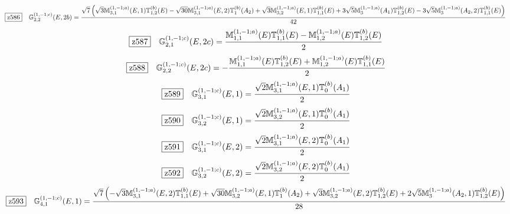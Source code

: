 \documentclass[fleqn,10pt,landscape]{jsarticle}
\begin{document}
\begin{dmath*}
\hspace*{3mm}\fbox{z586}\quad \mathbb{G}_{2,2}^{(1,-1;c)}(E,2b)=\frac{\sqrt{7} \left(\sqrt{3} \mathbb{M}_{3,1}^{(1,-1;a)}(E,1) \mathbb{T}_{1,2}^{(b)}(E) - \sqrt{30} \mathbb{M}_{3,1}^{(1,-1;a)}(E,2) \mathbb{T}_{1}^{(b)}(A_{2}) + \sqrt{3} \mathbb{M}_{3,2}^{(1,-1;a)}(E,1) \mathbb{T}_{1,1}^{(b)}(E) + 3 \sqrt{5} \mathbb{M}_{3}^{(1,-1;a)}(A_{1}) \mathbb{T}_{1,2}^{(b)}(E) - 3 \sqrt{5} \mathbb{M}_{3}^{(1,-1;a)}(A_{2},2) \mathbb{T}_{1,1}^{(b)}(E)\right)}{42}
\end{dmath*}
\begin{dmath*}
\hspace*{3mm}\fbox{z587}\quad \mathbb{G}_{2,1}^{(1,-1;c)}(E,2c)=\frac{\mathbb{M}_{1,1}^{(1,-1;a)}(E) \mathbb{T}_{1,1}^{(b)}(E) - \mathbb{M}_{1,2}^{(1,-1;a)}(E) \mathbb{T}_{1,2}^{(b)}(E)}{2}
\end{dmath*}
\begin{dmath*}
\hspace*{3mm}\fbox{z588}\quad \mathbb{G}_{2,2}^{(1,-1;c)}(E,2c)=- \frac{\mathbb{M}_{1,1}^{(1,-1;a)}(E) \mathbb{T}_{1,2}^{(b)}(E) + \mathbb{M}_{1,2}^{(1,-1;a)}(E) \mathbb{T}_{1,1}^{(b)}(E)}{2}
\end{dmath*}
\begin{dmath*}
\hspace*{3mm}\fbox{z589}\quad \mathbb{G}_{3,1}^{(1,-1;c)}(E,1)=\frac{\sqrt{2} \mathbb{M}_{3,1}^{(1,-1;a)}(E,1) \mathbb{T}_{0}^{(b)}(A_{1})}{2}
\end{dmath*}
\begin{dmath*}
\hspace*{3mm}\fbox{z590}\quad \mathbb{G}_{3,2}^{(1,-1;c)}(E,1)=\frac{\sqrt{2} \mathbb{M}_{3,2}^{(1,-1;a)}(E,1) \mathbb{T}_{0}^{(b)}(A_{1})}{2}
\end{dmath*}
\begin{dmath*}
\hspace*{3mm}\fbox{z591}\quad \mathbb{G}_{3,1}^{(1,-1;c)}(E,2)=\frac{\sqrt{2} \mathbb{M}_{3,1}^{(1,-1;a)}(E,2) \mathbb{T}_{0}^{(b)}(A_{1})}{2}
\end{dmath*}
\begin{dmath*}
\hspace*{3mm}\fbox{z592}\quad \mathbb{G}_{3,2}^{(1,-1;c)}(E,2)=\frac{\sqrt{2} \mathbb{M}_{3,2}^{(1,-1;a)}(E,2) \mathbb{T}_{0}^{(b)}(A_{1})}{2}
\end{dmath*}
\begin{dmath*}
\hspace*{3mm}\fbox{z593}\quad \mathbb{G}_{4,1}^{(1,-1;c)}(E,1)=\frac{\sqrt{7} \left(- \sqrt{3} \mathbb{M}_{3,1}^{(1,-1;a)}(E,2) \mathbb{T}_{1,1}^{(b)}(E) + \sqrt{30} \mathbb{M}_{3,2}^{(1,-1;a)}(E,1) \mathbb{T}_{1}^{(b)}(A_{2}) + \sqrt{3} \mathbb{M}_{3,2}^{(1,-1;a)}(E,2) \mathbb{T}_{1,2}^{(b)}(E) + 2 \sqrt{5} \mathbb{M}_{3}^{(1,-1;a)}(A_{2},1) \mathbb{T}_{1,2}^{(b)}(E)\right)}{28}
\end{dmath*}
\end{document}
